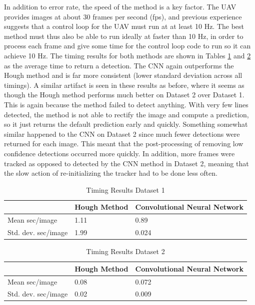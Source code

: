 \documentclass[12pt]{article}
\begin{document}
In addition to error rate, the speed of the method is a key factor. The UAV provides images at about 30 frames per second (fps), and previous experience suggests that a control loop for the UAV must run at at least 10 Hz. The best method must thus also be able to run ideally at faster than 10 Hz, in order to process each frame and give some time for the control loop code to run so it can achieve 10 Hz. The timing results for both methods are shown in Tables \ref{timing1} and \ref{timing2} as the average time to return a detection. The CNN again outperforms the Hough method and is far more consistent (lower standard deviation across all timings). A similar artifact is seen in these results as before, where it seems as though the Hough method performs much better on Dataset 2 over Dataset 1. This is again because the method failed to detect anything. With very few lines detected, the method is not able to rectify the image and compute a prediction, so it just returns the default prediction early and quickly. Something somewhat similar happened to the CNN on Dataset 2 since much fewer detections were returned for each image. This meant that the post-processing of removing low confidence detections occurred more quickly. In addition, more frames were tracked as opposed to detected by the CNN method in Dataset 2, meaning that the slow action of re-initializing the tracker had to be done less often. 

\begin{table}[H]
\begin{tabular}{l|l|l|}
\cline{2-3}
                                          & Hough Method & Convolutional Neural Network \\ \hline
\multicolumn{1}{|l|}{Mean sec/image}      & 1.11         & 0.89                         \\ \hline
\multicolumn{1}{|l|}{Std. dev. sec/image} & 1.99         & 0.024                        \\ \hline
\end{tabular}
\vspace{20pt}
\caption{Timing Results Dataset 1}
\label{timing1}
\end{table}

\begin{table}[H]
    \begin{tabular}{l|l|l|}
\cline{2-3}
                                          & Hough Method & Convolutional Neural Network \\ \hline
\multicolumn{1}{|l|}{Mean sec/image}      & 0.08         & 0.072                        \\ \hline
\multicolumn{1}{|l|}{Std. dev. sec/image} & 0.02         & 0.009                        \\ \hline
\end{tabular}
\vspace{20pt}
\caption{Timing Results Dataset 2}
\label{timing2}
\end{table}
\end{document}

